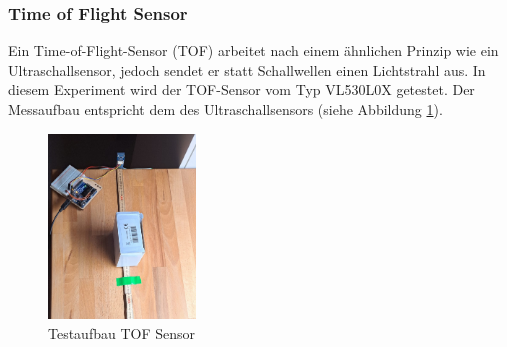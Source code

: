 \documentclass[../main.tex]{subfiles}
\begin{document}
\newpage
\subsubsection{Time of Flight Sensor}
Ein Time-of-Flight-Sensor (TOF) arbeitet nach einem ähnlichen Prinzip wie ein Ultraschallsensor, jedoch sendet er statt Schallwellen einen Lichtstrahl aus. In diesem Experiment wird der TOF-Sensor vom Typ VL530L0X getestet. Der Messaufbau entspricht dem des Ultraschallsensors (siehe Abbildung \ref{fig:TOF1}).

\begin{figure}[h!] %
    \centering
    \includegraphics[width=0.35\textwidth]{img/sensortest/MA_TOF.jpg} %
    \caption{Testaufbau TOF Sensor}
    \label{fig:TOF1} %
\end{figure}
\end{document}
